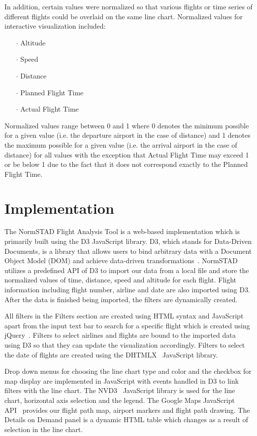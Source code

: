 \documentclass{sig-alternate}
\begin{document}
In addition, certain values were normalized
so that various flights or time series of different
flights could be overlaid on the same line chart.
Normalized values for interactive visualization
included:
\begin{itemize}
\item[$\cdot$] Altitude
\item[$\cdot$] Speed
\item[$\cdot$] Distance
\item[$\cdot$] Planned Flight Time 
\item[$\cdot$] Actual Flight Time
\end{itemize}

Normalized values range between 0 and 1
where 0 denotes the minimum possible for a given value (i.e. the departure airport
in the case of distance) and 1 denotes the maximum possible 
for a given value (i.e. the arrival airport in the case of distance) 
for all values with the exception that Actual Flight Time may
exceed 1 or be below 1 due to the fact that it does not correspond exactly 
to the Planned Flight Time.


\section{Implementation}
\label{sec-architecture}

The NormSTAD Flight Analysis Tool is a web-based implementation which is primarily built
using the D3 JavaScript library. D3, which stands for Data-Driven Documents, is a 
library that allows users to bind arbitrary data with a Document Object Model (DOM)
and achieve data-driven transformations~\cite{D3}. NormSTAD utilizes a predefined API of D3
to import our data from a local file
 and store the normalized values of time, distance, speed and altitude
for each flight. Flight information including flight number, airline and date are also imported
using D3. After the data is finished being imported, the filters are dynamically created.

All filters in the Filters section
 are created using HTML syntax and JavaScript apart from the input text bar
to search for a specific flight which is created using jQuery~\cite{jQuery}.
Filters to select airlines and flights are bound to the imported data using D3 so that
they can update the visualization accordingly. Filters to select the date of flights
are created using the DHTMLX~\cite{DHTMLX} JavaScript library.

Drop down menus for choosing the line chart type and color and the checkbox for map display
are implemented in JavaScript with events handled in D3 to link filters with the line chart.
The NVD3~\cite{NVD3} JavaScript library is used for the line chart, horizontal axis 
selection and the legend. The Google Maps JavaScript API~\cite{API} provides our flight path map,
airport markers and flight path drawing. The Details on Demand panel is a dynamic
HTML table which changes as a result of selection in the line chart.
\end{document}
